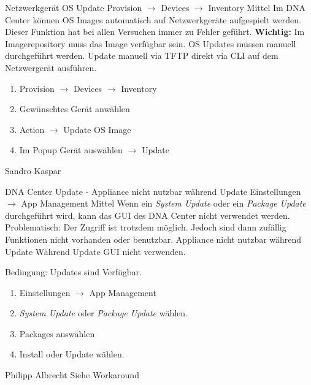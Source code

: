 \bugreport
{Netzwerkgerät OS Update}
{Provision $\rightarrow$ Devices $\rightarrow$ Inventory}
{Mittel}
{Im DNA Center können OS Images automatisch auf Netzwerkgeräte aufgespielt werden. Dieser Funktion hat bei allen Versuchen immer zu Fehler geführt. 
\textbf{Wichtig:}
Im Imagerepository muss das Image verfügbar sein. }
{OS Updates müssen manuell durchgeführt werden.}
{Update manuell via TFTP direkt via CLI auf dem Netzwergerät ausführen.}
{
	\begin{enumerate}
		\item Provision $\rightarrow$ Devices $\rightarrow$ Inventory
		\item Gewünschtes Gerät anwählen 
		\item Action $\rightarrow$ Update OS Image
		\item Im Popup Gerät auswählen $\rightarrow$ Update
	\end{enumerate}
}
{Sandro Kaspar}
{}

\bugreport
{DNA Center Update - Appliance nicht nutzbar während Update}
{Einstellungen $\rightarrow$ App Management}
{Mittel}
{Wenn ein \textit{System Update} oder ein \textit{Package Update} durchgeführt wird, kann das GUI des DNA Center nicht verwendet werden. Problematisch: Der Zugriff ist trotzdem möglich. Jedoch sind dann zufällig Funktionen nicht vorhanden oder benutzbar.}
{Appliance nicht nutzbar während Update}
{Während Update GUI nicht verwenden.}
{
	Bedingung: Updates sind Verfügbar.
	\begin{enumerate}
		\item Einstellungen $\rightarrow$ App Management
		\item \textit{System Update} oder \textit{Package Update} wählen.
		\item Packages auswählen
		\item Install oder Update wählen.
	\end{enumerate}
}
{Philipp Albrecht}
{Siehe Workaround}







